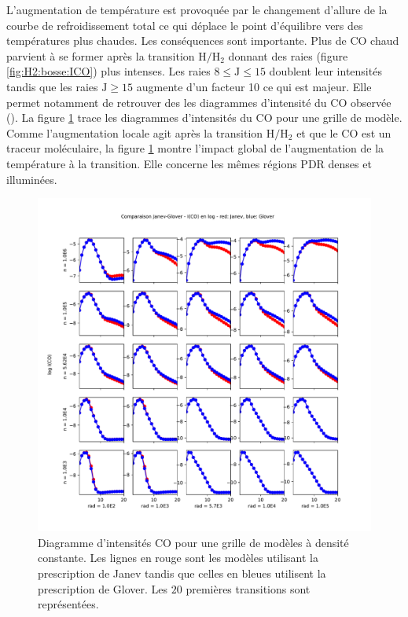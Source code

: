 L'augmentation de température est provoquée par le changement d'allure de la courbe de refroidissement total ce qui déplace le point d'équilibre vers des températures plus chaudes. Les conséquences sont importante. Plus de $\mathrm{CO}$ chaud parvient à se former après la transition $\mathrm{H}/\mathrm{H}_2$ donnant des raies (figure \ref{fig:H2:bosse:ICO}) plus intenses. Les raies $ 8 \leq \mathrm{J}\leq 15$ doublent leur intensités tandis que les raies $\mathrm{J}\geq 15$ augmente d'un facteur 10 ce qui est majeur. Elle permet notamment de retrouver des les diagrammes d'intensité du $\mathrm{CO}$ observée (\cite{COJoblin}). La figure \ref{fig:H2:bosse:IgridCO} trace les diagrammes d'intensités du $\mathrm{CO}$ pour une grille de modèle. Comme l'augmentation locale agit après la transition $\mathrm{H}/\mathrm{H}_2$ et que le $\mathrm{CO}$ est un traceur moléculaire, la figure \ref{fig:H2:bosse:IgridCO} montre l'impact global de l'augmentation de la température à la transition. Elle concerne les mêmes régions PDR denses et illuminées. 

\begin{figure}[!p]
    \centering
    \includegraphics[trim = {0 0 0 3cm },clip,width=1\textwidth]{figure/H2/bosse_dcte_janevVSglover/PlotComp_Janev_Glover_IntCO.pdf}
    \caption{Diagramme d'intensités $\mathrm{CO}$ pour une grille de modèles à densité constante. Les lignes en rouge sont les modèles utilisant la prescription de Janev tandis que celles en bleues utilisent la prescription de Glover. Les $20$ premières transitions sont représentées.}
    \label{fig:H2:bosse:IgridCO}
\end{figure}



